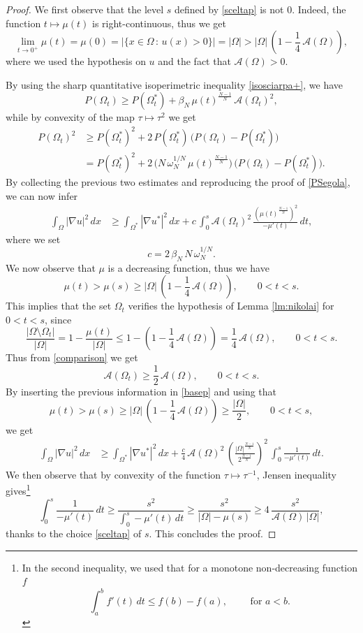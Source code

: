\documentclass{amsart}
\theoremstyle{definition}
\numberwithin{equation}{section}
\begin{document}
\begin{proof}
We first observe that the level $s$ defined by \eqref{sceltap} is not $0$. Indeed, the function $t\mapsto \mu(t)$ is right-continuous, thus we get
\[
\lim_{t\to 0^+} \mu(t)=\mu(0)=|\{x\in\Omega\, :\, u(x)>0\}|=|\Omega|>|\Omega|\,\left(1-\frac{1}{4}\,\mathcal{A}(\Omega)\right),
\]
where we used the hypothesis on $u$ and the fact that $\mathcal{A}(\Omega)>0$.
\par
By using the sharp quantitative isoperimetric inequality \eqref{isosciarpa+}, we have
\begin{equation}
\label{isoFMP}
P(\Omega_t)\ge P(\Omega^*_t)+\beta_N\, \mu(t)^\frac{N-1}{N}\,\mathcal{A}(\Omega_t)^2,
\end{equation}
while by convexity of the map $\tau\mapsto \tau^2$ we get
\[
\begin{split}
P(\Omega_t)^2&\ge P(\Omega^*_t)^2+2\, P(\Omega^*_t)\, \Big(P(\Omega_t)- P(\Omega^*_t)\Big)\\
&=P(\Omega^*_t)^2+2\, \Big(N\, \omega_N^{1/N}\, \mu(t)^\frac{N-1}{N}\Big)\,\Big(P(\Omega_t)- P(\Omega^*_t)\Big).
\end{split}
\]
By collecting the previous two estimates and reproducing the proof of \eqref{PSegola}, we can now infer
\begin{equation}
\label{basep}
\begin{split}
\int_\Omega |\nabla u|^2\,dx&\ge \int_{\Omega^*} |\nabla u^*|^2\,dx+c\,\int_0^s \mathcal{A}(\Omega_t)^2\, \frac{\left(\mu(t)^\frac{N-1}{N}\right)^{2}}{-\mu'(t)}\, dt,
\end{split}
\end{equation}
where we set 
\[
c=2\,\beta_N\,N\,\omega_N^{1/N}.
\]
We now observe that $\mu$ is a decreasing function, thus we have
\[
\mu(t)> \mu(s)\ge |\Omega|\,\left(1-\frac{1}{4}\,\mathcal{A}(\Omega)\right),\qquad 0<t<s.
\]
This implies that the set $\Omega_t$ verifies the hypothesis of Lemma \ref{lm:nikolai} for $0<t<s$, since
\[
\frac{|\Omega\setminus\Omega_t|}{|\Omega|}=1-\frac{\mu(t)}{|\Omega|}\le 1-\left(1-\frac{1}{4}\,\mathcal{A}(\Omega)\right)=\frac{1}{4}\,\mathcal{A}(\Omega),\qquad 0<t<s.
\]
Thus from \eqref{comparison} we get
\[
\mathcal{A}(\Omega_t)\ge \frac{1}{2}\, \mathcal{A}(\Omega),\qquad 0<t<s.
\]
By inserting the previous information in \eqref{basep} and using that
\[
\mu(t)>\mu(s)\ge |\Omega|\,\left(1-\frac{1}{4}\,\mathcal{A}(\Omega)\right)\ge \frac{|\Omega|}{2},\qquad 0<t<s,
\] 
we get
\[
\begin{split}
\int_\Omega |\nabla u|^2\, dx&\ge \int_{\Omega^*} |\nabla u^*|^2\,dx+\frac{c}{4}\,\mathcal{A}(\Omega)^2\,\left(\frac{|\Omega|^\frac{N-1}{N}}{2^\frac{N-1}{N}} \right)^2\,\int_0^s\frac{1}{-\mu'(t)}\, dt.
\end{split}
\]
We then observe that by convexity of the function $\tau\mapsto \tau^{-1}$, Jensen inequality gives\footnote{In the second inequality, we used that for a monotone non-decreasing function $f$
\[
\int_a^b f'(t)\,dt\le f(b)-f(a),\qquad \mbox{ for } a<b.
\]}
\[
\int_0^s\frac{1}{-\mu'(t)}\, dt\ge \frac{s^2}{\displaystyle\int_0^s -\mu'(t)\, dt}\ge \frac{s^2}{|\Omega|-\mu(s)}\ge 4\,\frac{s^2}{\mathcal{A}(\Omega)\, |\Omega|}, 
\]
thanks to the choice \eqref{sceltap} of $s$. This concludes the proof.
\end{proof}
\end{document}
